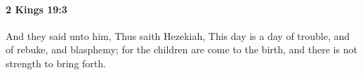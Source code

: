 
		\paragraph{2 Kings 19:3} %
			\label{2KINGS-19-3}

			And they said unto him, Thus saith Hezekiah, This day is a day of trouble, and of rebuke, and blasphemy; for the children are come to the birth, and there is not strength to bring forth.


